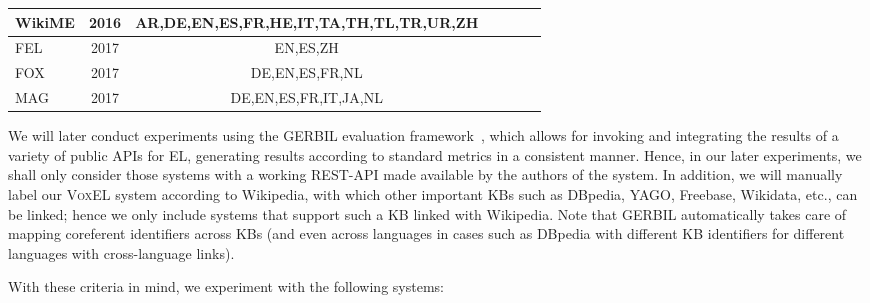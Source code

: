 \documentclass{llncs}
\newcommand{\cmark}{\ding{51}}%
\newcommand{\xmark}{\ding{55}}%
\begin{document}
\begin{table}[t]
{\begin{tabular}{lcccccr}
		WikiME \cite{Cross-Lingual-Wikifier-tsai2016cross} & 2016 & AR,DE,EN,ES,FR,HE,IT,TA,TH,TL,TR,UR,ZH&\cmark&\cmark&\xmark&\xmark\\\midrule		
		
		FEL~\cite{FEL-pappu2017lightweight}& 2017 &EN,ES,ZH&\cmark&\xmark&\cmark&\xmark\\\midrule
        
		FOX~\cite{fox2017}&2017&DE,EN,ES,FR,NL&\cmark&\cmark&\cmark&\cmark\\\midrule
        
        MAG \cite{mag2017}& 2017 & DE,EN,ES,FR,IT,JA,NL&\xmark&\cmark&\cmark&\cmark\\
		
		\bottomrule
	\end{tabular}
}
\end{table}

We will later conduct experiments using the GERBIL evaluation framework~\cite{gerbil-2015}, which allows for invoking and integrating the results of a variety of public APIs for EL, generating results according to standard metrics in a consistent manner. Hence, in our later experiments, we shall only consider those systems with a working REST-API made available by the authors of the system. In addition, we will manually label our \textsc{VoxEL} system according to Wikipedia, with which other important KBs such as DBpedia, YAGO, Freebase, Wikidata, etc., can be linked; hence we only include systems that support such a KB linked with Wikipedia. Note that GERBIL automatically takes care of mapping coreferent identifiers across KBs (and even across languages in cases such as DBpedia with different KB identifiers for different languages with cross-language links). 

With these criteria in mind, we experiment with the following systems: 
\end{document}
